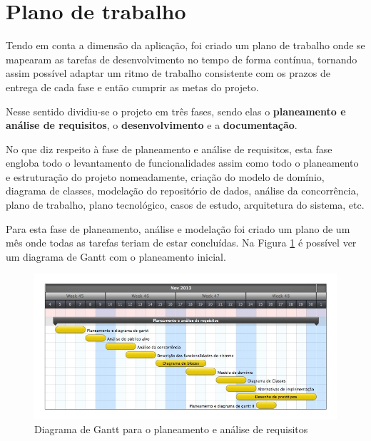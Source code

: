 \section{Plano de trabalho}

Tendo em conta a dimensão da aplicação, foi criado um plano de trabalho onde se mapearam as tarefas
de desenvolvimento no tempo de forma contínua, tornando assim possível adaptar um ritmo de trabalho
consistente com os prazos de entrega de cada fase e então cumprir as metas do projeto.

Nesse sentido dividiu-se o projeto em três fases, sendo elas o \textbf{planeamento e análise de requisitos}, o
\textbf{desenvolvimento} e a \textbf{documentação}.

No que diz respeito à fase de planeamento e análise de requisitos, esta fase engloba todo o levantamento 
de funcionalidades assim como todo o planeamento e estruturação do projeto 
nomeadamente, criação do modelo de domínio, diagrama de classes, modelação do repositório de dados,
análise da concorrência, plano de trabalho, plano tecnológico, casos de estudo, arquitetura do sistema, etc.

Para esta fase de planeamento, análise e modelação foi criado um plano de um mês onde todas as tarefas 
teriam de estar concluídas. Na Figura \ref{fig: workplan1} é possível ver um diagrama de Gantt com
o planeamento inicial.

\begin{figure}[H] 
  \centering
  \includegraphics[width=1\textwidth]{images/plano_de_trabalho/gannt_1.png}
  \caption{Diagrama de Gantt para o planeamento e análise de requisitos}
  \label{fig: workplan1}
\end{figure}

